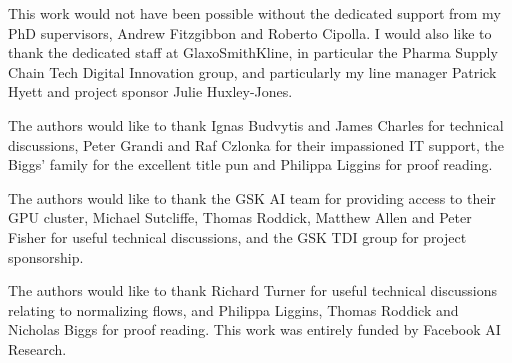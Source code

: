 
\begin{acknowledgements}      


This work would not have been possible without the dedicated support from my PhD supervisors, Andrew Fitzgibbon and Roberto Cipolla. I would also like to thank the dedicated staff at GlaxoSmithKline, in particular the Pharma Supply Chain Tech Digital Innovation group, and particularly my line manager Patrick Hyett and project sponsor Julie Huxley-Jones. 


The authors would like to thank Ignas Budvytis and James Charles for technical discussions, Peter Grandi and Raf Czlonka for their impassioned IT support, the Biggs' family for the excellent title pun and Philippa Liggins for proof reading.

The authors would like to thank the GSK AI team for providing access to their GPU cluster, Michael Sutcliffe, Thomas Roddick, Matthew Allen and Peter Fisher for useful technical discussions, and the GSK TDI group for project sponsorship. 

The authors would like to thank Richard Turner for useful technical discussions relating to normalizing flows, and Philippa Liggins, Thomas Roddick and Nicholas Biggs for proof reading. This work was entirely funded by Facebook AI Research.

\end{acknowledgements}
